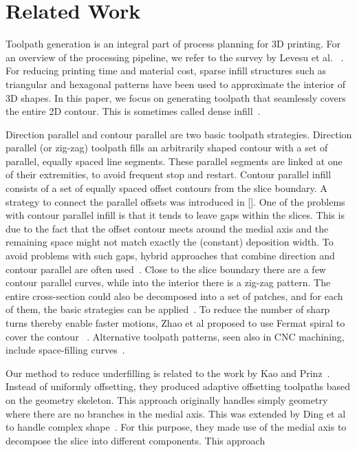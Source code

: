 \section{Related Work}

Toolpath generation is an integral part of process planning for 3D printing. For an overview of the processing pipeline, we refer to the survey by Levesu et al.~\cite{Livesu2017CGF} . For reducing printing time and material cost, sparse infill structures such as triangular and hexagonal patterns have been used to approximate the interior of 3D shapes. In this paper, we focus on generating toolpath that seamlessly covers the entire 2D contour. This is sometimes called dense infill~\cite{Livesu2017CGF}.



Direction parallel and contour parallel are two basic toolpath strategies. Direction parallel (or zig-zag) toolpath fills an arbitrarily shaped contour with a set of parallel, equally spaced line segments. These parallel segments are linked at one of their extremities, to avoid frequent stop and restart. Contour parallel infill consists of a set of equally spaced offset contours from the slice boundary. A strategy to connect the parallel offsets was introduced in []. One of the problems with contour parallel infill is that it tends to leave gaps within the slices. This is due to the fact that the offset contour meets around the medial axis and the remaining space might not match exactly the (constant) deposition width. To avoid problems with such gaps, hybrid approaches that combine direction and contour parallel are often used~\cite{Mcmains2000DETC,Jin2013adaptive}. Close to the slice boundary there are a few contour parallel curves, while into the interior there is a zig-zag pattern. The entire cross-section could also be decomposed into a set of patches, and for each of them, the basic strategies can be applied~\cite{Ding2014}. To reduce the number of sharp turns thereby enable faster motions, Zhao et al proposed to use Fermat spiral to cover the contour ~\cite{Zhao2016}. Alternative toolpath patterns, seen also in CNC machining, include space-filling curves~\cite{Cox1994CAD}.



Our method to reduce underfilling is related to the work by Kao and Prinz~\cite{kao1998optimal}. Instead of uniformly offsetting, they produced adaptive offsetting toolpaths based on the geometry skeleton. This approach originally handles simply geometry where there are no branches in the medial axis. This was extended by Ding et al to handle complex shape~\cite{}. For this purpose, they made use of the medial axis to decompose the slice into different components. This approach 



